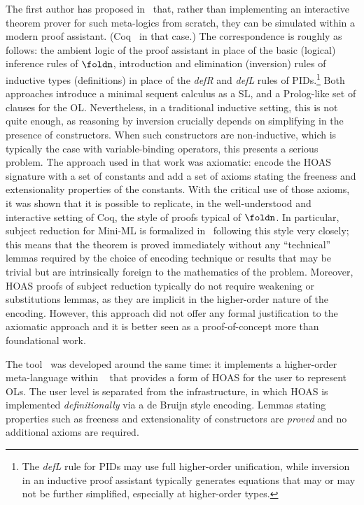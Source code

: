 \documentclass[final]{svjour3}
\begin{document}
The first author has proposed in~\cite{Felty02} that, rather than
implementing an interactive theorem prover for such meta-logics from
scratch, they can be simulated within a modern proof assistant.
(Coq~\cite{bertot/casteran:2004} in that case.)  The correspondence is
roughly as follows: the ambient logic of the proof assistant in place
of the basic (logical) inference rules of $\foldn$, introduction and
elimination (inversion) rules of inductive types (definitions) in
place of the \emph{defR} and \emph{defL} rules of PIDs.\footnote{The
  \emph{defL} rule for PIDs may use full higher-order unification,
  while inversion in an inductive proof assistant typically generates
  equations that may or may not be further simplified, especially at
  higher-order types.}  Both approaches introduce a minimal sequent calculus
\cite{JoMinLog} as a SL, and a Prolog-like set of clauses for the
OL\@.  Nevertheless, in a traditional inductive setting, this is not
quite enough, as reasoning by inversion crucially depends on
simplifying in the presence of constructors. When such constructors
are non-inductive, which is typically the case with variable-binding
operators, this presents a serious problem.  The approach used in that
work was axiomatic: encode the HOAS signature with  a set of constants
and add a set of axioms stating the freeness and extensionality
properties of the constants.  With the critical use of those axioms,
it was shown that it is possible to replicate, in the well-understood
and interactive setting of Coq, the style of proofs typical of
$\foldn$.  In particular, subject reduction for Mini-ML is formalized
in~\cite{Felty02} following this style very closely; this means that
the theorem is proved immediately without any ``technical'' lemmas
required by the choice of encoding technique or results that may be
trivial but are intrinsically foreign to the mathematics of the
problem. Moreover, HOAS proofs of subject reduction typically do not
require weakening or substitutions lemmas, as they are implicit in the
higher-order nature of the encoding. However, this approach did not
offer any formal justification to the axiomatic approach and it is
better seen as a proof-of-concept more than foundational work.

The \hybrid tool~\cite{Ambler02} was developed around the same time:
it implements a higher-order meta-language within
\HOL~\cite{Nipkow-Paulson-Wenzel:2002} that provides a form of HOAS
for the user to represent OLs.  The user level is separated from the
infrastructure, in which HOAS is implemented \emph{definitionally} via
a de Bruijn style encoding.  Lemmas stating properties such as
freeness and extensionality of constructors are \emph{proved} and no
additional axioms are required.
\end{document}
